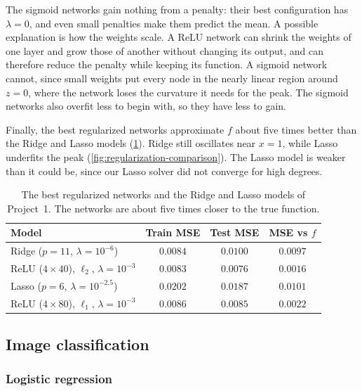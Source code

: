 The sigmoid networks gain nothing from a penalty: their best configuration has $\lambda = 0$,
and even small penalties make them predict the mean. A possible explanation is how the
weights scale. A ReLU network can shrink the weights of one layer and grow those of another
without changing its output, and
can therefore reduce the penalty while keeping its function. A sigmoid network cannot, since
small weights put every node in the nearly linear region around $z = 0$, where the network
loses the curvature it needs for the peak. The sigmoid networks also overfit less to begin
with, so they have less to gain.

Finally, the best regularized networks approximate $f$ about five times better than the Ridge
and Lasso models (\cref{tab:regularization-comparison}).
Ridge still oscillates near $x = 1$, while Lasso underfits the peak
(\cref{fig:regularization-comparison}). The Lasso
model is weaker than it could be, since our Lasso solver did not converge for high degrees.

\begin{table}[htbp]
    \centering
    \caption{The best regularized networks and the Ridge and Lasso models of Project~1. The
          networks are about five times closer to the true function.}
    \label{tab:regularization-comparison}
    {\footnotesize\setlength{\tabcolsep}{4pt}
    \begin{tabular}{@{}lccc@{}}
        \toprule
        Model & Train MSE & Test MSE & MSE vs $f$ \\
        \midrule
        Ridge ($p = 11$, $\lambda = 10^{-6}$) & $0.0084$ & $0.0100$ & $0.0097$ \\
        ReLU ($4 \times 40$), $\ell_2$, $\lambda = 10^{-3}$ & $0.0083$ & $0.0076$ & $0.0016$ \\
        Lasso ($p = 6$, $\lambda = 10^{-2.5}$) & $0.0202$ & $0.0187$ & $0.0101$ \\
        ReLU ($4 \times 80$), $\ell_1$, $\lambda = 10^{-3}$ & $0.0086$ & $0.0085$ & $0.0022$ \\
        \bottomrule
    \end{tabular}}
\end{table}

\subsection{Image classification}

\subsubsection{Logistic regression}

